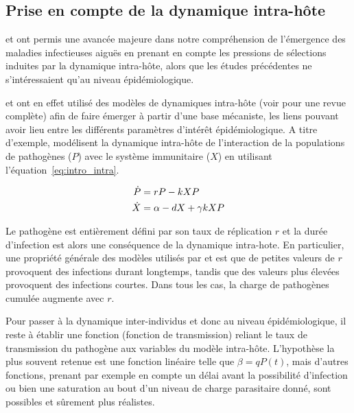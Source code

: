 \subsection{Prise en compte de la dynamique intra-hôte}

\citet{Read2006} et \citet{King2009} ont permis une avancée majeure
dans notre compréhension de l'émergence des maladies infectieuses
aiguës en prenant en compte les pressions de sélections induites par
la dynamique intra-hôte, alors que les études précédentes ne
s'intéressaient qu'au niveau épidémiologique.

\citet{Read2006} et \citet{King2009} ont en effet utilisé des modèles
de dynamiques intra-hôte (voir \citet{Alizon2008a} pour une revue
complète) afin de faire émerger à partir d'une base mécaniste, les
liens pouvant avoir lieu entre les différents paramètres d'intérêt
épidémiologique.  A titre d'exemple, \citet{King2009} modélisent la
dynamique intra-hôte de l'interaction de la populations de pathogènes
($P$) avec le système immunitaire ($X$) en utilisant
l'équation~\eqref{eq:intro_intra}.

\begin{align}
  \label{eq:intro_intra}
  \dot{P} &= rP - kXP \\
  \dot{X} &= \alpha -dX +\gamma kXP \notag
\end{align}

Le pathogène est entièrement défini par son taux de réplication $r$ et
la durée d'infection est alors une conséquence de la dynamique
intra-hote. En particulier, une propriété générale des modèles
utilisés par \citet{Read2006} et \citet{King2009} est que de petites
valeurs de $r$ provoquent des infections durant longtemps, tandis que
des valeurs plus élevées provoquent des infections courtes. Dans tous
les cas, la charge de pathogènes cumulée augmente avec $r$.

Pour passer à la dynamique inter-individus et donc au niveau
épidémiologique, il reste à établir une fonction (fonction de
transmission) reliant le taux de transmission du pathogène aux
variables du modèle intra-hôte.  L'hypothèse la plus souvent retenue
est une fonction linéaire telle que $\beta=qP(t)$, mais d'autres
fonctions, prenant par exemple en compte un délai avant la possibilité
d'infection ou bien une saturation au bout d'un niveau de charge
parasitaire donné, sont possibles et sûrement plus réalistes.

